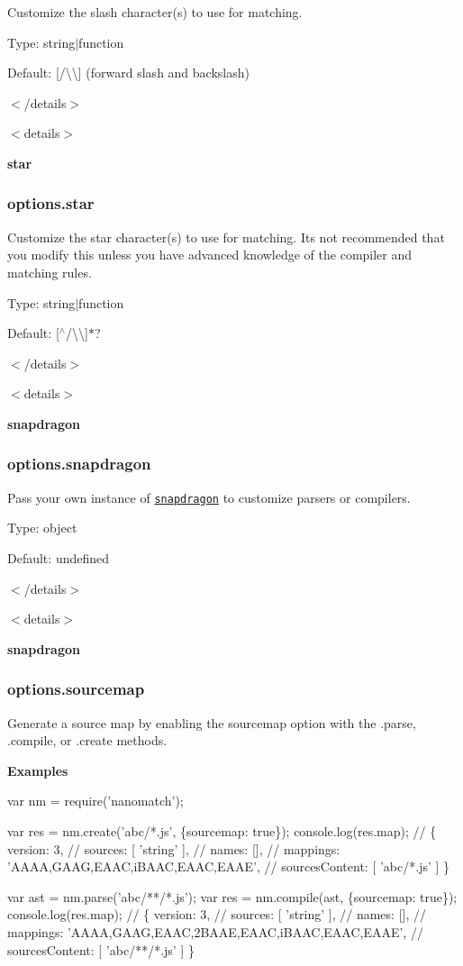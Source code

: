 Customize the slash character(s) to use for matching.

Type\+: {\ttfamily string$\vert$function}

Default\+: {\ttfamily \mbox{[}/\textbackslash{}\textbackslash{}\mbox{]}} (forward slash and backslash)

$<$/details$>$

$<$details$>$ 

{\bfseries \label{_star}%
star}

\subsubsection*{options.\+star}

Customize the star character(s) to use for matching. It\textquotesingle{}s not recommended that you modify this unless you have advanced knowledge of the compiler and matching rules.

Type\+: {\ttfamily string$\vert$function}

Default\+: {\ttfamily \mbox{[}$^\wedge$/\textbackslash{}\textbackslash{}\mbox{]}$\ast$?}

$<$/details$>$

$<$details$>$ 

{\bfseries \label{_snapdragon}%
snapdragon}

\subsubsection*{options.\+snapdragon}

Pass your own instance of \href{https://github.com/jonschlinkert/snapdragon}{\tt snapdragon} to customize parsers or compilers.

Type\+: {\ttfamily object}

Default\+: {\ttfamily undefined}

$<$/details$>$

$<$details$>$ 

{\bfseries snapdragon}

\subsubsection*{options.\+sourcemap}

Generate a source map by enabling the {\ttfamily sourcemap} option with the {\ttfamily .parse}, {\ttfamily .compile}, or {\ttfamily .create} methods.

{\bfseries Examples}


\begin{DoxyCode}
var nm = require('nanomatch');

var res = nm.create('abc/*.js', \{sourcemap: true\});
console.log(res.map);
// \{ version: 3,
//   sources: [ 'string' ],
//   names: [],
//   mappings: 'AAAA,GAAG,EAAC,iBAAC,EAAC,EAAE',
//   sourcesContent: [ 'abc/*.js' ] \}

var ast = nm.parse('abc/**/*.js');
var res = nm.compile(ast, \{sourcemap: true\});
console.log(res.map);
// \{ version: 3,
//   sources: [ 'string' ],
//   names: [],
//   mappings: 'AAAA,GAAG,EAAC,2BAAE,EAAC,iBAAC,EAAC,EAAE',
//   sourcesContent: [ 'abc/**/*.js' ] \}
\end{DoxyCode}



